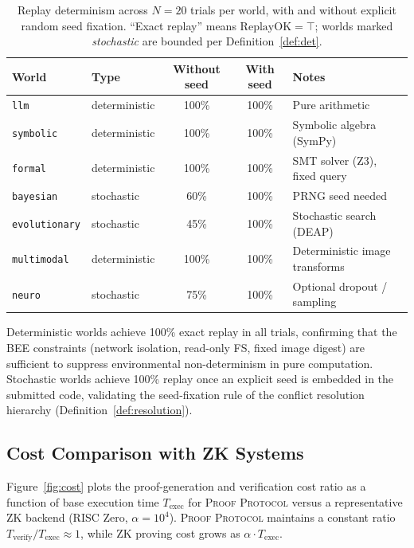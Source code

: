 \documentclass[11pt]{article}
\begin{document}
\begin{table}[h]
\centering
\caption{Replay determinism across $N=20$ trials per world, with and without
explicit random seed fixation.  ``Exact replay'' means $\mathrm{ReplayOK} =
\top$; worlds marked \emph{stochastic} are bounded per Definition~\ref{def:det}.}
\label{tab:determinism}
\begin{tabular}{llcc p{4.5cm}}
\toprule
\textbf{World} & \textbf{Type}
  & \textbf{Without seed} & \textbf{With seed} & \textbf{Notes} \\
\midrule
\texttt{llm}          & deterministic & 100\% & 100\% & Pure arithmetic \\
\texttt{symbolic}     & deterministic & 100\% & 100\% & Symbolic algebra (SymPy) \\
\texttt{formal}       & deterministic & 100\% & 100\% & SMT solver (Z3), fixed query \\
\texttt{bayesian}     & stochastic    &  60\% & 100\% & PRNG seed needed \\
\texttt{evolutionary} & stochastic    &  45\% & 100\% & Stochastic search (DEAP) \\
\texttt{multimodal}   & deterministic & 100\% & 100\% & Deterministic image transforms \\
\texttt{neuro}        & stochastic    &  75\% & 100\% & Optional dropout / sampling \\
\bottomrule
\end{tabular}
\end{table}

Deterministic worlds achieve 100\% exact replay in all trials, confirming
that the BEE constraints (network isolation, read-only FS, fixed image
digest) are sufficient to suppress environmental non-determinism in pure
computation.  Stochastic worlds achieve 100\% replay once an explicit seed
is embedded in the submitted code, validating the seed-fixation rule of the
conflict resolution hierarchy (Definition~\ref{def:resolution}).

\subsection{Cost Comparison with ZK Systems}

Figure~\ref{fig:cost} plots the proof-generation and verification cost ratio
as a function of base execution time $T_{\mathrm{exec}}$ for \textsc{Proof
Protocol} versus a representative ZK backend (RISC Zero, $\alpha = 10^4$).
\textsc{Proof Protocol} maintains a constant ratio $T_{\mathrm{verify}} /
T_{\mathrm{exec}} \approx 1$, while ZK proving cost grows as
$\alpha \cdot T_{\mathrm{exec}}$.
\end{document}
